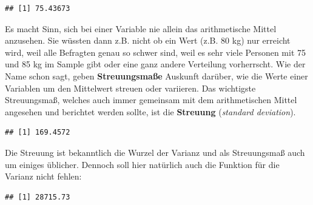 \documentclass[
]{book}
\newenvironment{Shaded}{\begin{snugshade}}{\end{snugshade}}
\newcommand{\AttributeTok}[1]{\textcolor[rgb]{0.77,0.63,0.00}{#1}}
\newcommand{\ConstantTok}[1]{\textcolor[rgb]{0.00,0.00,0.00}{#1}}
\newcommand{\FloatTok}[1]{\textcolor[rgb]{0.00,0.00,0.81}{#1}}
\newcommand{\FunctionTok}[1]{\textcolor[rgb]{0.00,0.00,0.00}{#1}}
\newcommand{\NormalTok}[1]{#1}
\newcommand{\SpecialCharTok}[1]{\textcolor[rgb]{0.00,0.00,0.00}{#1}}
\begin{document}
\begin{Shaded}
\end{Shaded}

\begin{verbatim}
## [1] 75.43673
\end{verbatim}

Es macht Sinn, sich bei einer Variable nie allein das arithmetische Mittel anzusehen. Sie wüssten dann z.B. nicht ob ein Wert (z.B. 80 kg) nur erreicht wird, weil alle Befragten genau so schwer sind, weil es sehr viele Personen mit 75 und 85 kg im Sample gibt oder eine ganz andere Verteilung vorherrscht. Wie der Name schon sagt, geben \textbf{Streuungsmaße} Auskunft darüber, wie die Werte einer Variablen um den Mittelwert streuen oder variieren. Das wichtigste Streuungsmaß, welches auch immer gemeinsam mit dem arithmetischen Mittel angesehen und berichtet werden sollte, ist die \textbf{Streuung} (\emph{standard deviation}).

\begin{Shaded}
\end{Shaded}

\begin{verbatim}
## [1] 169.4572
\end{verbatim}

Die Streuung ist bekanntlich die Wurzel der Varianz und als Streuungsmaß auch um einiges üblicher. Dennoch soll hier natürlich auch die Funktion für die Varianz nicht fehlen:

\begin{Shaded}
\end{Shaded}

\begin{verbatim}
## [1] 28715.73
\end{verbatim}
\end{document}
